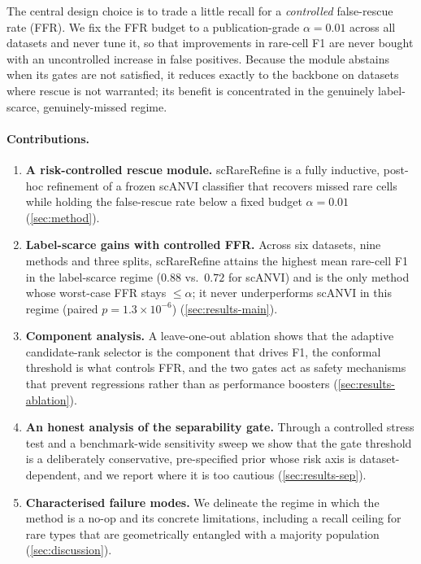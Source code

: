 The central design choice is to trade a little recall for a \emph{controlled} false-rescue rate (FFR). We fix the
FFR budget to a publication-grade $\alpha=0.01$ across all datasets and never tune it, so that improvements in
rare-cell F1 are never bought with an uncontrolled increase in false positives. Because the module abstains when
its gates are not satisfied, it reduces exactly to the backbone on datasets where rescue is not warranted; its
benefit is concentrated in the genuinely label-scarce, genuinely-missed regime.

\paragraph{Contributions.}
\begin{enumerate}
\item \textbf{A risk-controlled rescue module.} scRareRefine is a fully inductive, post-hoc refinement of a frozen
scANVI classifier that recovers missed rare cells while holding the false-rescue rate below a fixed budget
$\alpha=0.01$ (\cref{sec:method}).
\item \textbf{Label-scarce gains with controlled FFR.} Across six datasets, nine methods and three splits, scRareRefine
attains the highest mean rare-cell F1 in the label-scarce regime ($0.88$ vs.\ $0.72$ for scANVI) and is the only
method whose worst-case FFR stays $\le\alpha$; it never underperforms scANVI in this regime
(paired $p=1.3\times10^{-6}$) (\cref{sec:results-main}).
\item \textbf{Component analysis.} A leave-one-out ablation shows that the adaptive candidate-rank selector is the
component that drives F1, the conformal threshold is what controls FFR, and the two gates act as safety mechanisms
that prevent regressions rather than as performance boosters (\cref{sec:results-ablation}).
\item \textbf{An honest analysis of the separability gate.} Through a controlled stress test and a benchmark-wide
sensitivity sweep we show that the gate threshold is a deliberately conservative, pre-specified prior whose
risk axis is dataset-dependent, and we report where it is too cautious (\cref{sec:results-sep}).
\item \textbf{Characterised failure modes.} We delineate the regime in which the method is a no-op and its concrete
limitations, including a recall ceiling for rare types that are geometrically entangled with a majority population
(\cref{sec:discussion}).
\end{enumerate}

